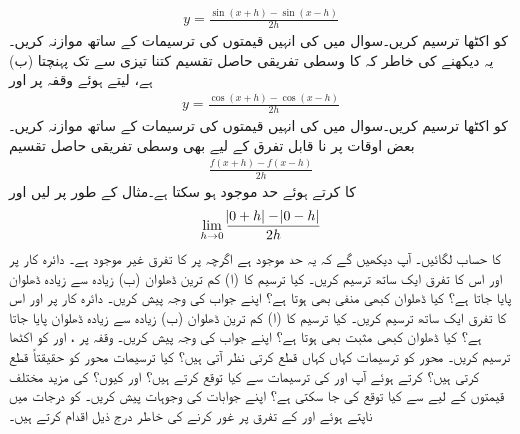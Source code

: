 \begin{align*}
y=\frac{\sin(x+h)-\sin(x-h)}{2h}
\end{align*}
کو اکٹھا ترسیم کریں۔سوال  میں  کی انہیں قیمتوں کی ترسیمات کے  ساتھ موازنہ کریں۔\\
(ب)  یہ دیکھنے کی خاطر کہ  کا وسطی تفریقی  حاصل تقسیم  کتنا تیزی سے  تک پہنچتا ہے،  لیتے ہوئے وقفہ  پر  اور 
\begin{align*}
y=\frac{\cos(x+h)-\cos(x-h)}{2h}
\end{align*}
کو اکٹھا ترسیم کریں۔سوال  میں  کی انہیں قیمتوں کی  ترسیمات کے  ساتھ موازنہ کریں۔
بعض اوقات  پر نا قابل تفرق  کے لیے بھی وسطی تفریقی حاصل تقسیم
\begin{align*}
\frac{f(x+h)-f(x-h)}{2h}
\end{align*}
 کا  کرتے ہوئے حد موجود ہو سکتا ہے۔مثال کے طور پر  لیں اور 
\begin{align*}
\lim_{h\to 0}\frac{\abs{0+h}-\abs{0-h}}{2h}
\end{align*}
کا حساب لگائیں۔ آپ دیکھیں گے کہ یہ حد موجود ہے اگرچہ  پر  کا تفرق غیر موجود ہے۔
دائرہ کار  پر  اور اس کا تفرق ایک ساتھ ترسیم کریں۔ کیا ترسیم کا  (ا) کم ترین ڈھلوان (ب) زیادہ سے زیادہ ڈھلوان پایا جاتا ہے؟  کیا ڈھلوان کبھی منفی بھی ہوتا ہے؟ اپنے جواب کی وجہ پیش کریں۔
دائرہ کار   پر  اور اس کا تفرق ایک ساتھ ترسیم کریں۔ کیا ترسیم کا  (ا) کم ترین ڈھلوان (ب) زیادہ سے زیادہ ڈھلوان پایا جاتا ہے؟  کیا ڈھلوان کبھی مثبت  بھی ہوتا ہے؟ اپنے جواب کی وجہ پیش کریں۔
وقفہ  پر ،  اور  کو اکٹھا  ترسیم کریں۔ محور  کو   ترسیمات کہاں کہاں قطع کرتی نظر آتی ہیں؟ کیا ترسیمات محور کو حقیقتاً  قطع کرتی ہیں؟  کرتے ہوئے آپ  اور  کی ترسیمات سے کیا توقع کرتے ہیں؟ اور کیوں؟  کی مزید مختلف قیمتوں کے لیے  سے کیا توقع کی جا سکتی ہے؟ اپنے جوابات کی وجوہات پیش کریں۔
 کو درجات میں ناپتے ہوئے  اور  کے  تفرق پر غور کرنے کی خاطر درج ذیل اقدام کرتے ہیں۔

